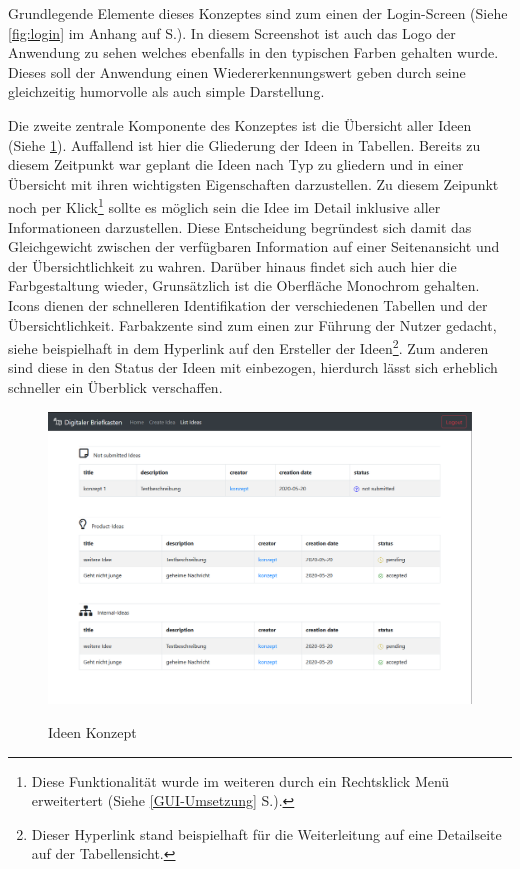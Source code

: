 Grundlegende Elemente dieses Konzeptes sind zum einen der Login-Screen (Siehe \cref{fig:login} im Anhang auf S.\pageref{fig:login}).
In diesem Screenshot ist auch das Logo der Anwendung zu sehen welches ebenfalls in den typischen Farben gehalten wurde. Dieses soll der Anwendung einen Wiedererkennungswert geben durch seine gleichzeitig humorvolle als auch simple Darstellung.

Die zweite zentrale Komponente des Konzeptes ist die Übersicht aller Ideen (Siehe \cref{fig:ideen}).
Auffallend ist hier die Gliederung der Ideen in Tabellen. Bereits zu diesem Zeitpunkt war geplant die Ideen nach Typ zu gliedern und in einer Übersicht mit ihren wichtigsten Eigenschaften darzustellen. 
Zu diesem Zeipunkt noch per Klick\footnote{Diese Funktionalität wurde im weiteren durch ein Rechtsklick Menü erweitertert (Siehe \ref{GUI-Umsetzung} S.\pageref{GUI-Umsetzung}).} sollte es möglich sein die Idee im Detail inklusive aller Informationeen darzustellen. Diese Entscheidung begründest sich damit das Gleichgewicht zwischen der verfügbaren Information auf einer Seitenansicht und der Übersichtlichkeit zu wahren.
Darüber hinaus findet sich auch hier die Farbgestaltung wieder, Grunsätzlich ist die Oberfläche Monochrom gehalten. Icons dienen der schnelleren Identifikation der verschiedenen Tabellen und der Übersichtlichkeit. Farbakzente sind zum einen zur Führung der Nutzer gedacht, siehe beispielhaft in dem Hyperlink auf den Ersteller der Ideen\footnote{Dieser Hyperlink stand beispielhaft für die Weiterleitung auf eine Detailseite auf der Tabellensicht.}. Zum anderen sind diese in den Status der Ideen mit einbezogen, hierdurch lässt sich erheblich schneller ein Überblick verschaffen.

\begin{figure}[hbt]
\centering
\begin{minipage}[t]{1\textwidth}
    \caption{Ideen Konzept}
    \includegraphics[width=1\textwidth]{img/ideen-konzept.png}\\
    \label{fig:ideen}
\end{minipage}
\end{figure}

